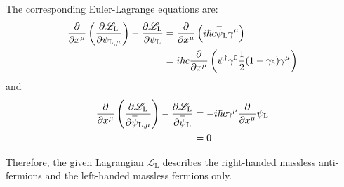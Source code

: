 \documentclass[letterpaper,12pt]{article}
\newenvironment{problem}{\subsection{}\begin{adjustwidth}{0.25in}{}\vspace{-\baselineskip}}{\end{adjustwidth}}
\newcommand{\pder}[2]{\frac{\partial #1}{\partial #2}}
\newcommand{\lagr}{\mathscr{L}}
\newcommand{\overbar}[1]{
	\mkern 1.5mu \overline{\mkern-1.5mu\raisebox{0pt}[\dimexpr\height+0.5mm\relax]{$#1$}\mkern-1.5mu}\mkern 1.5mu
}
\begin{document}
\begin{problem}
The corresponding Euler-Lagrange equations are:
\begin{align*}
	\pder{}{x^\mu}\left(\pder{\lagr_\text{L}}{\psi_{\text{L},\mu}}\right) - \pder{\lagr_\text{L}}{\psi_\text{L}}
	&= \pder{}{x^\mu} \left(i\hbar c \overbar{\psi}_\text{L}\gamma^\mu\right)	\\
	&= i\hbar c \pder{}{x^\mu} \left(\psi^\dagger \gamma^0 \frac{1}{2}(1+\gamma_5) \gamma^\mu\right)
\end{align*}
and
\begin{align*}
	\pder{}{x^\mu}\left(\pder{\lagr_\text{L}}{\overbar{\psi}_{\text{L},\mu}}\right) - \pder{\lagr_\text{L}}{\overbar{\psi}_\text{L}}
	&= - i\hbar c \gamma^\mu \pder{}{x^\mu} \psi_\text{L}	\\
	&= 0
\end{align*}

Therefore, the given Lagrangian $\lagr_\text{L}$ describes the right-handed massless anti-fermions and the left-handed massless fermions only.	
\end{problem}
\end{document}
